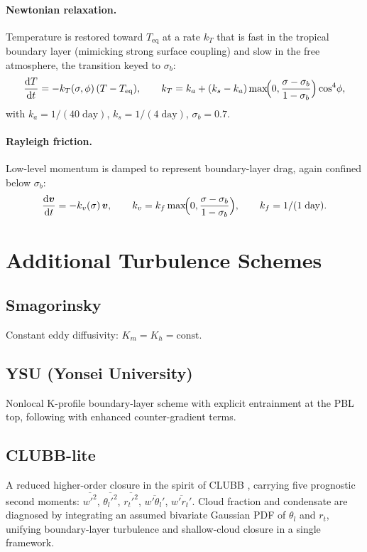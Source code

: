 \documentclass[11pt,twoside]{report}
\newcommand{\dd}{\mathrm{d}}
\newcommand{\vect}[1]{\bm{#1}}
\begin{document}
\paragraph{Newtonian relaxation.}
Temperature is restored toward $T_{\mathrm{eq}}$ at a rate $k_T$ that is fast
in the tropical boundary layer (mimicking strong surface coupling) and slow in
the free atmosphere, the transition keyed to $\sigma_b$:
\begin{equation}
  \frac{\dd T}{\dd t} = -k_T(\sigma,\phi)\,(T-T_{\mathrm{eq}}),
  \qquad
  k_T = k_a + (k_s-k_a)\max\!\Bigl(0,\frac{\sigma-\sigma_b}{1-\sigma_b}\Bigr)
  \cos^4\!\phi,
\end{equation}
with $k_a=1/(40\;\text{day})$, $k_s=1/(4\;\text{day})$, $\sigma_b=0.7$.

\paragraph{Rayleigh friction.}
Low-level momentum is damped to represent boundary-layer drag, again confined
below $\sigma_b$:
\begin{equation}
  \frac{\dd\vect{v}}{\dd t} = -k_v(\sigma)\,\vect{v},
  \qquad
  k_v = k_f\max\!\Bigl(0,\frac{\sigma-\sigma_b}{1-\sigma_b}\Bigr),
  \qquad k_f=1/(1\;\text{day}).
\end{equation}


\section{Additional Turbulence Schemes}

\subsection{Smagorinsky}
Constant eddy diffusivity: $K_m = K_h = \mathrm{const}$.

\subsection{YSU (Yonsei University)}
Nonlocal K-profile boundary-layer scheme with explicit entrainment at the PBL top, following \citet{HoltslagBoville1993} with enhanced counter-gradient terms.

\subsection{CLUBB-lite}
A reduced higher-order closure in the spirit of CLUBB \citep{Golaz2002},
carrying five prognostic second moments:
$\overline{w'^2}$, $\overline{\theta_l'^2}$, $\overline{r_t'^2}$,
$\overline{w'\theta_l'}$, $\overline{w'r_t'}$.
Cloud fraction and condensate are diagnosed by integrating an assumed
bivariate Gaussian PDF of $\theta_l$ and $r_t$, unifying boundary-layer
turbulence and shallow-cloud closure in a single framework.
\end{document}
